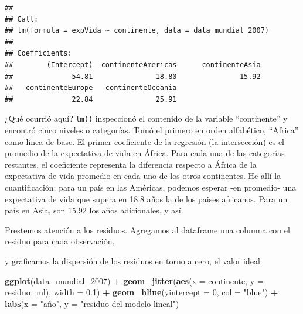 \documentclass[]{book}
\newenvironment{Shaded}{\begin{snugshade}}{\end{snugshade}}
\newcommand{\KeywordTok}[1]{\textcolor[rgb]{0.13,0.29,0.53}{\textbf{#1}}}
\newcommand{\DataTypeTok}[1]{\textcolor[rgb]{0.13,0.29,0.53}{#1}}
\newcommand{\DecValTok}[1]{\textcolor[rgb]{0.00,0.00,0.81}{#1}}
\newcommand{\FloatTok}[1]{\textcolor[rgb]{0.00,0.00,0.81}{#1}}
\newcommand{\StringTok}[1]{\textcolor[rgb]{0.31,0.60,0.02}{#1}}
\newcommand{\OperatorTok}[1]{\textcolor[rgb]{0.81,0.36,0.00}{\textbf{#1}}}
\newcommand{\NormalTok}[1]{#1}
\begin{document}
\begin{verbatim}
## 
## Call:
## lm(formula = expVida ~ continente, data = data_mundial_2007)
## 
## Coefficients:
##        (Intercept)  continenteAmericas      continenteAsia  
##              54.81               18.80               15.92  
##   continenteEurope   continenteOceania  
##              22.84               25.91
\end{verbatim}

¿Qué ocurrió aquí? \texttt{lm()} inspeccionó el contenido de la variable
``continente'' y encontró cinco niveles o categorías. Tomó el primero en
orden alfabético, ``Africa'' como línea de base. El primer coeficiente
de la regresión (la intersección) es el promedio de la expectativa de
vida en África. Para cada una de las categorías restantes, el
coeficiente representa la diferencia respecto a África de la expectativa
de vida promedio en cada uno de los otros continentes. He allí la
cuantificación: para un país en las Américas, podemos esperar -en
promedio- una expectativa de vida que supera en 18.8 años la de los
paises africanos. Para un país en Asia, son 15.92 los años adicionales,
y así.

Prestemos atención a los residuos. Agregamos al dataframe una columna
con el residuo para cada observación,

\begin{Shaded}
\end{Shaded}

y graficamos la dispersión de los residuos en torno a cero, el valor
ideal:

\begin{Shaded}
\begin{Highlighting}[]
\KeywordTok{ggplot}\NormalTok{(data_mundial_}\DecValTok{2007}\NormalTok{) }\OperatorTok{+}
\StringTok{    }\KeywordTok{geom_jitter}\NormalTok{(}\KeywordTok{aes}\NormalTok{(}\DataTypeTok{x =}\NormalTok{ continente, }\DataTypeTok{y =}\NormalTok{ residuo_ml), }\DataTypeTok{width =} \FloatTok{0.1}\NormalTok{) }\OperatorTok{+}
\StringTok{    }\KeywordTok{geom_hline}\NormalTok{(}\DataTypeTok{yintercept =} \DecValTok{0}\NormalTok{, }\DataTypeTok{col =} \StringTok{"blue"}\NormalTok{) }\OperatorTok{+}
\StringTok{    }\KeywordTok{labs}\NormalTok{(}\DataTypeTok{x =} \StringTok{"año"}\NormalTok{, }\DataTypeTok{y =} \StringTok{"residuo del modelo lineal"}\NormalTok{)}
\end{Highlighting}
\end{Shaded}
\end{document}

